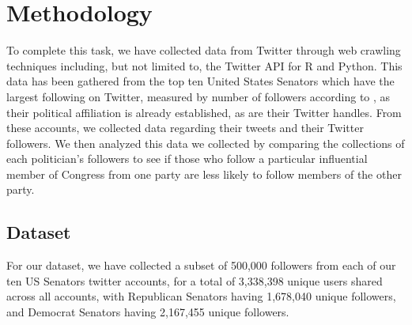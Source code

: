 \documentclass[journal]{IEEEtran}
\begin{document}
	\section{Methodology}
	
	To complete this task, we have collected data from Twitter through web crawling techniques including, but not limited to, the Twitter API for R and Python. This data has been gathered from the top ten United States Senators which have the largest following on Twitter, measured by number of followers according to \cite{senatorFollowers}, as their political affiliation is already established, as are their Twitter handles. From these accounts, we collected data regarding their tweets and their Twitter followers. We then analyzed this data we collected by comparing the collections of each politician's followers to see if those who follow a particular influential member of Congress from one party are less likely to follow members of the other party. 

	
	
	
	\subsection{Dataset}
	
	For our dataset, we have collected a subset of 500,000 followers from each of our ten US Senators twitter accounts, for a total of 3,338,398 unique users shared across all accounts, with Republican Senators having 1,678,040 unique followers, and Democrat Senators having 2,167,455 unique followers. 
\end{document}
